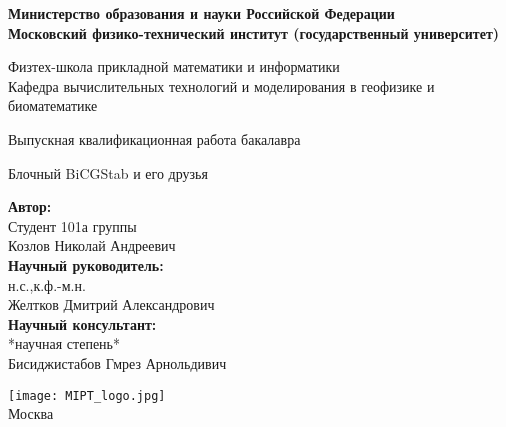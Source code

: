 \begin{center}
    \large\textbf{Министерство образования и науки Российской Федерации \\
    Московский физико-технический институт (государственный
    университет)} \\
    \vspace{1cm}

    Физтех-школа прикладной математики и информатики \\

    Кафедра вычислительных технологий и моделирования в геофизике и биоматематике\\

    \vspace{3em}

    Выпускная квалификационная работа бакалавра
\end{center}

\begin{center}
    \vspace{\fill}
    \LARGE{Блочный BiCGStab и его друзья}

    \vspace{\fill}
\end{center}


\begin{flushright}
    \textbf{Автор:} \\
    Студент 101а группы \\
    Козлов Николай Андреевич \\
    \vspace{2em}
    \textbf{Научный руководитель:} \\
    н.с.,к.ф.-м.н. \\
    Желтков Дмитрий Александрович \\
    \vspace{2em}
    \textbf{Научный консультант:} \\
    *научная степень* \\
    Бисиджистабов Гмрез Арнольдивич \\
\end{flushright}

\vspace{7em}

\begin{center}
    \texttt{[image: MIPT\_logo.jpg]}\\
    Москва \the\year{}
\end{center}

\thispagestyle{empty}

\newpage
\setcounter{page}{2}
\fancyfoot[c]{\thepage}
\fancyhead[R]{}